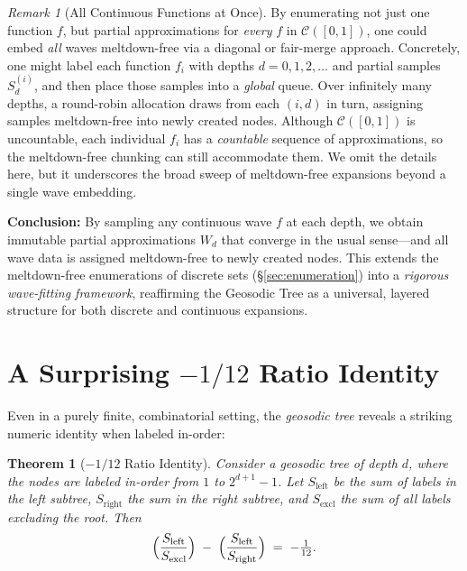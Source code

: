 \documentclass[acmsmall]{acmart}
\newtheorem{theorem}{Theorem}
\theoremstyle{definition}
\theoremstyle{remark}
\newtheorem*{remark}{Remark}
\begin{document}
\begin{remark}[All Continuous Functions at Once]
  By enumerating not just one function $f$, but partial approximations for
  \emph{every} $f$ in $\mathcal{C}([0,1])$, one could embed \emph{all} waves meltdown-free
  via a diagonal or fair-merge approach. Concretely, one might label each function $f_i$
  with depths $d=0,1,2,\dots$ and partial samples $S_d^{(i)}$, and then place those
  samples into a \emph{global} queue. Over infinitely many depths, a round-robin allocation
  draws from each $(i,d)$ in turn, assigning samples meltdown-free into newly created nodes.
  Although $\mathcal{C}([0,1])$ is uncountable, each individual $f_i$ has a \emph{countable}
  sequence of approximations, so the meltdown-free chunking can still accommodate them.
  We omit the details here, but it underscores the broad sweep of meltdown-free expansions
  beyond a single wave embedding.
\end{remark}

\smallskip

\noindent
\textbf{Conclusion:} By sampling any continuous wave $f$ at each depth, we obtain
immutable partial approximations $W_d$ that converge in the usual sense---and
all wave data is assigned meltdown-free to newly created nodes. This extends
the meltdown-free enumerations of discrete sets (\S\ref{sec:enumeration}) into a
\emph{rigorous wave-fitting framework}, reaffirming the Geosodic Tree as a
universal, layered structure for both discrete and continuous expansions.
 \section{A Surprising \texorpdfstring{$-1/12$}{-1/12} Ratio Identity}
\label{sec:ratio}

Even in a purely finite, combinatorial setting, the \emph{geosodic tree} 
reveals a striking numeric identity when labeled in-order:

\begin{theorem}[$-1/12$ Ratio Identity]
\label{thm:minus-twelfth}
Consider a geosodic tree of depth $d$, where the nodes are labeled in-order 
from $1$ to $2^{d+1}-1$. Let $S_{\text{left}}$ be the sum of labels in the 
left subtree, $S_{\text{right}}$ the sum in the right subtree, and 
$S_{\text{excl}}$ the sum of all labels excluding the root. Then
\[
\Bigl(\frac{S_{\text{left}}}{S_{\text{excl}}}\Bigr)
\;-\;
\Bigl(\frac{S_{\text{left}}}{S_{\text{right}}}\Bigr)
\;=\;
-\tfrac{1}{12}.
\]
\end{theorem}
\end{document}
